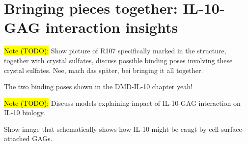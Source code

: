 \chapter{Bringing pieces together: IL-10-GAG interaction insights}
\lipsum[1-10]


\hl{Note (TODO):}
Show picture of R107 specifically marked in the structure, together with
crystal sulfates, discuss possible binding poses involving these crystal
sulfates. Nee, mach das später, bei bringing it all together.

The two binding poses shown in the DMD-IL-10 chapter yeah!


\hl{Note (TODO):}
Discuss models explaining impact of IL-10-GAG interaction on IL-10 biology.

Show image that schematically shows how IL-10 might be caugt by cell-surface-attached GAGs.

